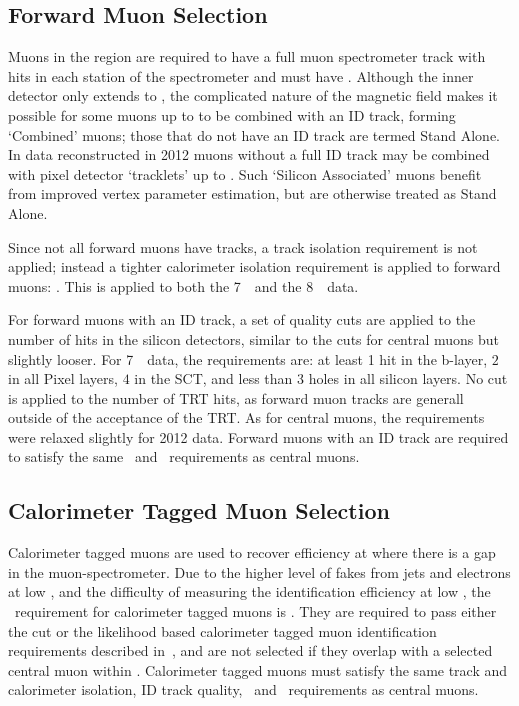 \subsection{Forward Muon Selection}

Muons in the region  are required to have a full muon
spectrometer track with hits in each station of the spectrometer and must have
. Although the
inner detector only extends to , the complicated nature of the
magnetic field makes it possible for some muons up to  to be
combined with an ID track, forming `Combined' muons; those that do not have an
ID track are termed Stand Alone.  In data reconstructed in 2012 muons without a
full ID track may be combined with pixel detector `tracklets' up to
. Such `Silicon Associated' muons benefit from improved vertex
parameter estimation, but are otherwise treated as Stand Alone. 

Since not all forward muons
have tracks, a track isolation requirement is not applied; instead a tighter calorimeter isolation
requirement is applied to forward muons: . This is applied
to both the 7~\tev\ and the 8~\tev\ data.

For forward muons with an ID track, a set of quality
cuts are applied to the number of hits in the silicon detectors, similar to the
cuts for central muons but slightly looser. For 7~\tev\ data,
the requirements are: at least 1 hit in the b-layer, $2$ in all Pixel layers,
$4$ in the SCT, and less than 3 holes 
in all silicon layers. No cut is applied to the number of TRT hits, as forward
muon tracks are generall outside of the acceptance of the TRT. As for
central muons, the requirements were relaxed slightly for 2012 data.
Forward muons with an ID track are required to satisfy the same
\zzero\ and \dzerosig\ requirements as central muons.

\subsection{Calorimeter Tagged Muon Selection}

Calorimeter tagged muons are used to recover efficiency at  where
there is a gap in the muon-spectrometer. Due to the higher level of fakes from jets and
electrons at low \pt, and the difficulty of measuring the identification
efficiency at low \pt, the \pt\ requirement for calorimeter tagged muons is
. They are required to pass either the cut or
the likelihood based calorimeter tagged muon identification requirements described
in~, and are not selected if they overlap with a selected
central muon within . Calorimeter tagged muons must satisfy the
same track and calorimeter isolation, ID track quality, \zzero\ and \dzerosig\
requirements as central muons.

